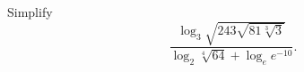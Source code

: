 Simplify
\[
\dfrac{\log_{3}\sqrt{243\sqrt{81\sqrt[3]{3}}}}{\log_{2}\sqrt[4]{64}+\log_{e}e^{-10}} .
\]
